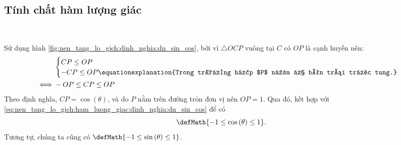 \subsection{Tính chất hàm lượng giác}

\ %

Sử dụng hình \ref{fig:nen_tang_lo_gich:dinh_nghia:dn_sin_cos}, bởi vì $\triangle OCP$ vuông tại $C$ có $OP$ là cạnh huyền nên:
\begin{align}
   &\begin{cases}
      CP \leq OP \\
      -CP \leq OP \equationexplanation{Trong trường hợp $P$ nằm ở bên trái trục tung.}
   \end{cases} \nonumber\\
   \iff &-OP \leq CP \leq OP \label{eq:nen_tang_lo_gich:ham_luong_giac:dinh_nghia:dn_sin_cos}
\end{align}
Theo định nghĩa, $CP = \cos \left(\theta\right)$, và do $P$ nằm trên đường tròn đơn vị nên $OP = 1$. Qua đó, kết hợp với \eqref{eq:nen_tang_lo_gich:ham_luong_giac:dinh_nghia:dn_sin_cos} để có
\begin{equation*}
   \defMath{-1 \leq \cos \left(\theta\right) \leq 1}.
\end{equation*}
Tương tự, chúng ta cũng có $\defMath{-1 \leq \sin \left(\theta\right) \leq 1}$.

